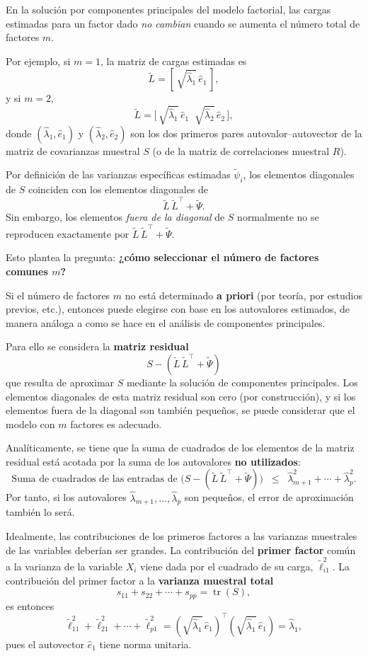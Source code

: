 \documentclass[
]{book}
\begin{document}
En la solución por componentes principales del modelo factorial, las cargas estimadas para un factor dado \emph{no cambian} cuando se aumenta el número total de factores \(m\).

Por ejemplo, si \(m = 1\), la matriz de cargas estimadas es
\[
\widetilde{L} = [\,\sqrt{\hat{\lambda}_1}\,\hat{e}_1\,],
\]
y si \(m = 2\),
\[
\widetilde{L} = 
\big[\,\sqrt{\hat{\lambda}_1}\,\hat{e}_1 
\;\; \sqrt{\hat{\lambda}_2}\,\hat{e}_2\,\big],
\]
donde \((\hat{\lambda}_1,\hat{e}_1)\) y \((\hat{\lambda}_2,\hat{e}_2)\) son los dos primeros pares autovalor--autovector de la matriz de covarianzas muestral \(S\) (o de la matriz de correlaciones muestral \(R\)).

Por definición de las varianzas específicas estimadas \(\tilde{\psi}_i\), los elementos diagonales de \(S\) coinciden con los elementos diagonales de
\[
\widetilde{L}\,\widetilde{L}^\top + \widetilde{\Psi}.
\]
Sin embargo, los elementos \emph{fuera de la diagonal} de \(S\) normalmente no se reproducen exactamente por \(\widetilde{L}\,\widetilde{L}^\top + \widetilde{\Psi}\).

Esto plantea la pregunta: \textbf{¿cómo seleccionar el número de factores comunes \(m\)?}

Si el número de factores \(m\) no está determinado \textbf{a priori} (por teoría, por estudios previos, etc.), entonces puede elegirse con base en los autovalores estimados, de manera análoga a como se hace en el análisis de componentes principales.

Para ello se considera la \textbf{matriz residual}
\[
S - (\widetilde{L}\,\widetilde{L}^{\top} + \widetilde{\Psi})
\]
que resulta de aproximar \(S\) mediante la solución de componentes principales. Los elementos diagonales de esta matriz residual son cero (por construcción), y si los elementos fuera de la diagonal son también pequeños, se puede considerar que el modelo con \(m\) factores es adecuado.

Analíticamente, se tiene que la suma de cuadrados de los elementos de la matriz residual está acotada por la suma de los autovalores \textbf{no utilizados}:
\[
\text{Suma de cuadrados de las entradas de }
\bigl(S - (\widetilde{L}\,\widetilde{L}^\top + \widetilde{\Psi})\bigr)
\;\;\le\;\;
\hat{\lambda}_{m+1}^2 + \cdots + \hat{\lambda}_p^2.
\]
Por tanto, si los autovalores \(\hat{\lambda}_{m+1},\dots,\hat{\lambda}_p\) son pequeños, el error de aproximación también lo será.

Idealmente, las contribuciones de los primeros factores a las varianzas muestrales de las variables deberían ser grandes. La contribución del \textbf{primer factor} común a la varianza de la variable \(X_i\) viene dada por el cuadrado de su carga, \(\tilde{\ell}_{i1}^2\). La contribución del primer factor a la \textbf{varianza muestral total}
\[
s_{11} + s_{22} + \cdots + s_{pp} = \operatorname{tr}(S),
\]
es entonces
\[
\tilde{\ell}_{11}^2 + \tilde{\ell}_{21}^2 + \cdots + \tilde{\ell}_{p1}^2
= (\sqrt{\hat{\lambda}_1}\,\hat{e}_1)^\top
(\sqrt{\hat{\lambda}_1}\,\hat{e}_1)
= \hat{\lambda}_1,
\]
pues el autovector \(\hat{e}_1\) tiene norma unitaria.
\end{document}
